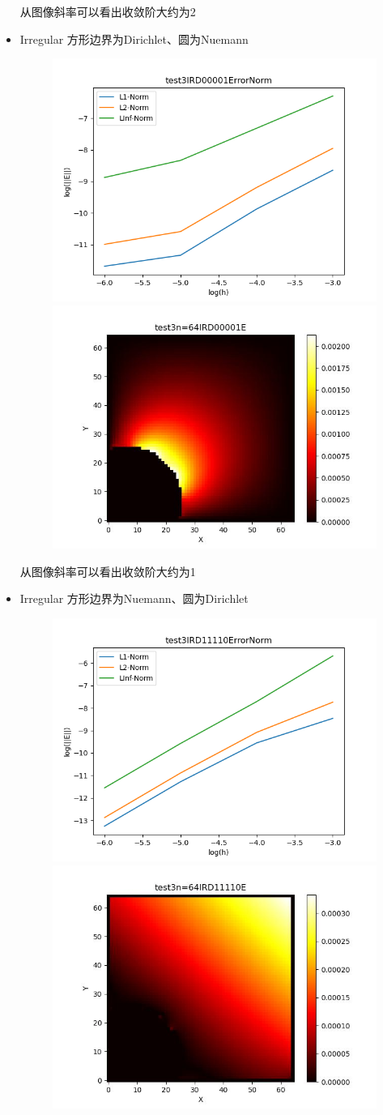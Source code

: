 \documentclass{article}
\begin{document}
\begin{itemize}
    从图像斜率可以看出收敛阶大约为2
    \newpage
    \item Irregular 方形边界为Dirichlet、圆为Nuemann
    \begin{figure}[h]
        \centering
        \includegraphics[width=0.35\linewidth]{test3IRD00001ErrorNormjpg.png}
        \includegraphics[width=0.35\linewidth]{test3n=64IRD00001E.jpg}
    \end{figure}

    从图像斜率可以看出收敛阶大约为1
    \item Irregular 方形边界为Nuemann、圆为Dirichlet
    \begin{figure}[h]
        \centering
        \includegraphics[width=0.35\linewidth]{test3IRD11110ErrorNormjpg.png}
        \includegraphics[width=0.35\linewidth]{test3n=64IRD11110E.jpg}
    \end{figure}


\end{itemize}
\end{document}
